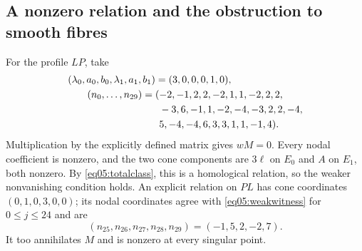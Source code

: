 \subsection{A nonzero relation and the obstruction to smooth fibres}

For the profile $LP$, take
\begin{equation}\label{eq05:weakwitness}
\begin{aligned}
 (\lambda_0,a_0,b_0,\lambda_1,a_1,b_1)&=(3,0,0,0,1,0),\\
 (n_0,\ldots,n_{29})={}&(-2,-1,2,2,-2,1,1,-2,2,2,\\
 &\hphantom{(}-3,6,-1,1,-2,-4,-3,2,2,-4,\\
 &\hphantom{(}5,-4,-4,6,3,3,1,1,-1,4).
\end{aligned}
\end{equation}
Multiplication by the explicitly defined matrix gives $wM=0$.
Every nodal coefficient is nonzero, and the two cone components are
$3\ell$ on $E_0$ and $A$ on $E_1$, both nonzero.  By
\eqref{eq05:totalclass}, this is a
homological relation, so the weaker nonvanishing condition holds.  An
explicit relation on $PL$ has cone coordinates $(0,1,0,3,0,0)$; its nodal
coordinates agree with \eqref{eq05:weakwitness} for $0\leq j\leq24$ and
are
\[
 (n_{25},n_{26},n_{27},n_{28},n_{29})=(-1,5,2,-2,7).
\]
It too annihilates $M$ and is nonzero at every singular point.


